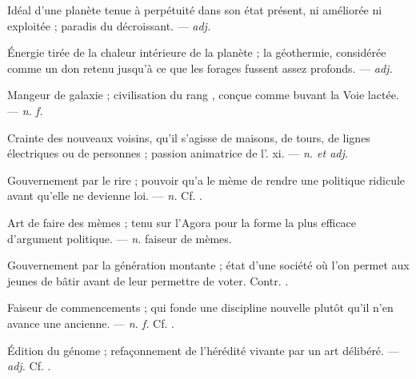  Idéal d'une planète tenue à perpétuité dans son état présent, ni améliorée ni exploitée ; paradis du décroissant. ---  \textit{adj.}

 Énergie tirée de la chaleur intérieure de la planète ; la géothermie, considérée comme un don retenu jusqu'à ce que les forages fussent assez profonds. ---  \textit{adj.}

 Mangeur de galaxie ; civilisation du rang , conçue comme buvant la Voie lactée. ---  \textit{n. f.}

 Crainte des nouveaux voisins, qu'il s'agisse de maisons, de tours, de lignes électriques ou de personnes ; passion animatrice de l'.   xi. ---  \textit{n. et adj.}

 Gouvernement par le rire ; pouvoir qu'a le mème de rendre une politique ridicule avant qu'elle ne devienne loi. ---  \textit{n.} Cf. .

 Art de faire des mèmes ; tenu sur l'Agora pour la forme la plus efficace d'argument politique.   ---  \textit{n.} faiseur de mèmes.

 Gouvernement par la génération montante ; état d'une société où l'on permet aux jeunes de bâtir avant de leur permettre de voter. Contr. .

 Faiseur de commencements ; qui fonde une discipline nouvelle plutôt qu'il n'en avance une ancienne. ---  \textit{n. f.} Cf. .

 Édition du génome ; refaçonnement de l'hérédité vivante par un art délibéré.  ---  \textit{adj.} Cf. .

